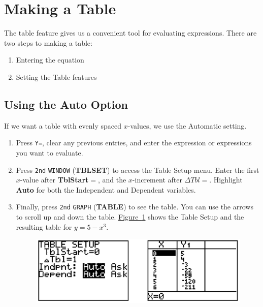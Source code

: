\documentclass[10pt,]{book}
\newcommand{\terminology}[1]{\textbf{#1}}
\theoremstyle{plain}
\theoremstyle{definition}
\theoremstyle{definition}
\theoremstyle{definition}
\numberwithin{equation}{part}
\begin{document}
\section[{Making a Table}]{Making a Table}\label{appendix-Making-a-Table}
The table feature gives us a convenient tool for evaluating expressions. There are two steps to making a table: \leavevmode%
\begin{enumerate}[label=*\arabic**]
\item\hypertarget{li-434}{}Entering the equation%
\item\hypertarget{li-435}{}Setting the Table features%
\end{enumerate}
%
\typeout{************************************************}
\typeout{************************************************}
\subsection[{Using the Auto Option}]{Using the Auto Option}\label{subsection-82}
If we want a table with evenly spaced \(x\)-values, we use the Automatic setting. \leavevmode%
\begin{enumerate}[label=*\arabic**]
\item\hypertarget{li-436}{}Press \lstinline?Y=?, clear any previous entries, and enter the expression or expressions you want to evaluate.%
\item\hypertarget{li-437}{}Press \lstinline?2nd? \lstinline?WINDOW? (\terminology{TBLSET}) to access the Table Setup menu. Enter the first \(x\)-value after \terminology{TblStart}\(=\), and the \(x\)-increment after \(\Delta Tbl=\). Highlight \terminology{Auto} for both the Independent and Dependent variables.%
\item\hypertarget{li-438}{}Finally, press \lstinline?2nd? \lstinline?GRAPH? (\terminology{TABLE}) to see the table. You can use the arrows to scroll up and down the table. \hyperref[fig-GC-table-setup]{Figure~\ref{fig-GC-table-setup}} shows the Table Setup and the resulting table for \(y = 5 − x^3\). \leavevmode%
\begin{figure}
\centering
\includegraphics[width=0.7\linewidth]{images/fig-GC-table-setup.jpg}
\caption{\label{fig-GC-table-setup}}
\end{figure}
%
\end{enumerate}
%
\typeout{************************************************}
\typeout{************************************************}
\end{document}
